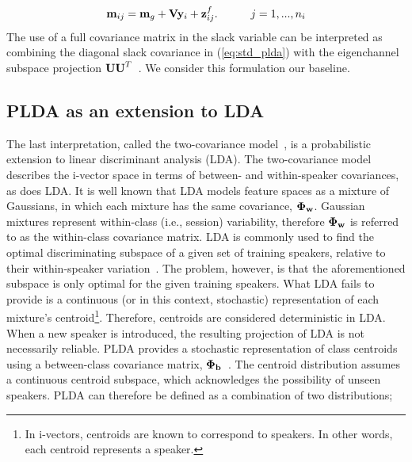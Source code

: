 \begin{equation}
\label{eq:simple_plda}
{\bf m}_{ij} = {\bf m}_g + {\bf V}{\bf y}_i+{\bf z}^f_{ij}.  \hspace{30pt} j=1,...,n_i
\end{equation}
The use of a full covariance matrix in the slack variable can be interpreted as combining the diagonal slack covariance in (\ref{eq:std_plda}) with the eigenchannel subspace projection ${\bf UU}^T$~\cite{sizov2014unifying}.
We consider this formulation our baseline. 

\subsection{PLDA as an extension to LDA}
\label{sec:twocov}
The last interpretation, called the two-covariance model~\cite{sizov2014unifying}, is a probabilistic extension to linear discriminant analysis (LDA). 
The two-covariance model describes the i-vector space in terms of between- and within-speaker covariances, as does LDA. 
It is well known that LDA models feature spaces as a mixture of Gaussians, in which each mixture has the same covariance, ${\bf \Phi_w}$. 
Gaussian mixtures represent within-class (i.e., session) variability, therefore ${\bf \Phi_w}$ is referred to as the within-class covariance matrix. 
LDA is commonly used to find the optimal discriminating subspace of a given set of training speakers, relative to their within-speaker variation~\cite{ioffePLDA2006}. 
The problem, however, is that the aforementioned subspace is only optimal for the given training speakers. 
What LDA fails to provide is a continuous (or in this context, stochastic) representation of each mixture's centroid\footnote{In i-vectors, centroids are known to correspond to speakers. In other words, each centroid represents a speaker.}. 
Therefore, centroids are considered deterministic in LDA. 
When a new speaker is introduced, the resulting projection of LDA is not necessarily reliable. 
PLDA provides a stochastic representation of class centroids using a between-class covariance matrix, ${\bf \Phi_b}$~\cite{ioffePLDA2006}. 
The centroid distribution assumes a continuous centroid subspace, which acknowledges the possibility of unseen speakers. 
PLDA can therefore be defined as a combination of two distributions; 
